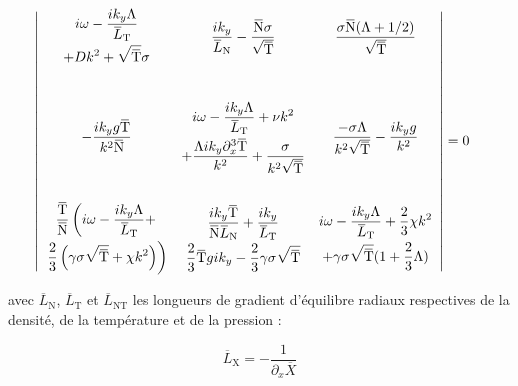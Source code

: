 \begin{refsection}
\small
\begin{equation}\mkern-20mu
\label{2-dispersion}
\left|\begin{array}{ccc}
\begin{gathered}
i\omega
-\dfrac{ik_y\Lambda}{\overbar{L}_{\text{T}}}\\+Dk^2+\sqrt{\overbar{\text{T}}}\sigma
\end{gathered}
&
\dfrac{ik_y}{\overbar{L}_\text{N}}-\dfrac{\overbar{\text{N}}\sigma}{\sqrt{\overbar{\text{T}}}}
&
\dfrac{\sigma\overbar{\text{N}}(\Lambda+1/2)}{\sqrt{\overbar{\text{T}}}}
\\[4em]
-\dfrac{ik_yg\overbar{\text{T}}}{k^2\overbar{\text{N}}} 
& \begin{gathered}
i\omega-\dfrac{ik_y\Lambda}{\overbar{L}_\text{T}}+\nu
k^2\\+\dfrac{\Lambda
ik_y\partial_x^3\overbar{\text{T}}}{k ^2}+\dfrac{\sigma}{k^2\sqrt{\overbar{\text{T}}}} \end{gathered}
&
\dfrac{-\sigma\Lambda}{k^2\sqrt{\overbar{\text{T}}}}-\dfrac{ik_yg}{k^2}
\\[4em]
\begin{gathered}
\dfrac{\overbar{\text{T}}}{\overbar{\text{N}}}\left(i\omega-\dfrac{ik_y\Lambda}{\overbar{L}_\text{T}}+\right.\\
\left.\dfrac{2}{3}\left(\gamma\sigma\sqrt{\overbar{\text{T}}}+\chi
k^2\right)\right)\end{gathered}
&
\begin{gathered}
\dfrac{ik_y\overbar{\text{T}}}{\overbar{\text{N}}\overbar{L}_\text{N}}+\dfrac{ik_y}{\overbar{L}_\text{T}}\\
\dfrac{2}{3}\overbar{\text{T}}gik_y-\dfrac{2}{3}\gamma\sigma\sqrt{\overbar{\text{T}}}
\end{gathered}
&
\begin{gathered}
i\omega-\dfrac{ik_y\Lambda}{\overbar{L}_\text{T}}+\dfrac{2}{3}\chi
k^2\\
+\gamma\sigma\sqrt{\overbar{\text{T}}}(1+\dfrac{2}{3}\Lambda)
\end{gathered}

\end{array}\right|=0\\[3ex]
\end{equation}
\normalsize

 avec $\overbar{L}_\text{N}$, $\overbar{L}_\text{T}$ et
 $\overbar{L}_\text{NT}$ les longueurs de gradient d'équilibre radiaux respectives de la densité, de la
 température et de la pression :
 
 \begin{equation}
 \overbar{L}_\text{X}=-\frac{1}{\partial_x\overbar{X}}
 \end{equation}
 

\end{refsection}
